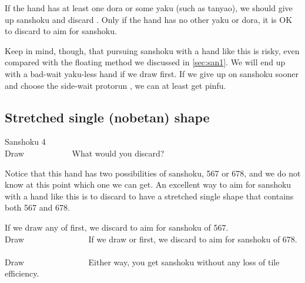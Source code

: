 \bigskip
If the hand has at least one {\jap dora} or some {\jap yaku} (such as {\jap tanyao}), we should give up {\jap sanshoku} and discard {\LARGE{}}. Only if the hand has no other {\jap yaku} or {\jap dora}, it is OK to discard {\LARGE{}} to aim for {\jap sanshoku}. 

\bigskip
Keep in mind, though, that pursuing {\jap sanshoku} with a hand like this is risky, even compared with the floating method we discussed in \ref{sec:san1}. We will end up with a bad-wait {\jap yaku}-less hand if we draw {\LARGE{}} first. If we give up on {\jap sanshoku} sooner and choose the side-wait protorun {\LARGE{}}, we can at least get {\jap pinfu}. 

\newpage
\subsection{Stretched single ({\jap nobetan}) shape}\label{sec:san4}
\begin{itembox}[r]{{\jap Sanshoku} 4}
\bp
{}~\\
\hfill\footnotesize{Draw~~~~~~~~~~~}
\ep
\vspace{-17pt}What would you discard? \vspace{-5pt}
\end{itembox}
\noindent
Notice that this hand has two possibilities of {\jap sanshoku}, 567 or 678, and we do not know at this point which one we can get. An excellent way to aim for {\jap sanshoku} with a hand like this is to discard {\LARGE{}} to have a stretched single shape {\LARGE{}} that contains both 567 and 678. 

\bigskip
\noindent If we draw any of {\LARGE{}} first, we discard {\LARGE{}} to aim for {\jap sanshoku} of 567. 
\bp
{}~\\
\hfill\footnotesize{Draw~~~~~~~~~~~~~~~}
\ep
If we draw {\LARGE{}} or {\LARGE{}} first, we discard {\LARGE{}} to aim for {\jap sanshoku} of 678. 
\bp
{}~\\
\hfill\footnotesize{Draw~~~~~~~~~~~~~~~}
\ep
Either way, you get {\jap sanshoku} without any loss of tile efficiency. 

